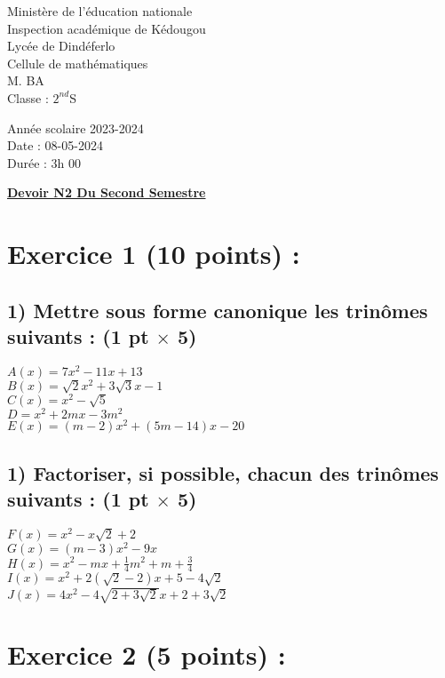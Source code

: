 \documentclass[12pt]{article}
\begin{document}
\begin{minipage}{0.5\textwidth}
	Ministère de l'éducation nationale  \\
	Inspection académique de Kédougou   \\
	Lycée de Dindéferlo            \\
	Cellule de mathématiques            \\
	M. BA                          \\
	Classe : $2^{nd}$S  \\
\end{minipage}
\begin{minipage}{0.5\textwidth}
	Année scolaire 2023-2024 \\
	Date : 08-05-2024 \\
	Durée : 3h 00 \\
\end{minipage}

\begin{center}
	\textbf{{\underline{Devoir N2 Du Second Semestre}}}
\end{center}

\section*{Exercice 1 (10 points) :}
\subsection*{1) Mettre sous forme canonique les trinômes suivants : (1 pt $\times$ 5)}
$A(x) = 7x^{2}-11x + 13$\\
$B(x) =\sqrt{2}x^{2}+3\sqrt{3}x-1$\\
$C(x) =x^{2}-\sqrt{5}$\\
$D =x^{2} + 2mx-3m^{2}$\\
$E(x) =(m-2)x^{2}+(5m-14)x-20$
\subsection*{1) Factoriser, si possible, chacun des trinômes suivants : (1 pt $\times$ 5)}
$F(x) =x^{2}-x\sqrt{2}+2$\\
$G(x)=(m-3)x^{2}-9x$\\ 
$H(x)=x^{2}-mx +\frac{1}{4}m^{2}+m+\frac{3}{4}$\\ 
$I(x)= x^{2} + 2(\sqrt{2}-2)x+5-4\sqrt{2}$\\ 
$J(x)=4x^{2}-4\sqrt{2+3\sqrt{2}}x+2+3\sqrt{2}$\\
\section*{Exercice 2 (5 points) :}
\end{document}
